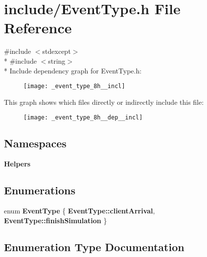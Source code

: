 \section{include/\+Event\+Type.h File Reference}
\label{_event_type_8h}
{\ttfamily \#include $<$stdexcept$>$}\\*
{\ttfamily \#include $<$string$>$}\\*
Include dependency graph for Event\+Type.\+h\+:
\nopagebreak
\begin{figure}[H]
\begin{center}
\leavevmode
\texttt{[image: \_event\_type\_8h\_\_incl]}
\end{center}
\end{figure}
This graph shows which files directly or indirectly include this file\+:
\nopagebreak
\begin{figure}[H]
\begin{center}
\leavevmode
\texttt{[image: \_event\_type\_8h\_\_dep\_\_incl]}
\end{center}
\end{figure}
\subsection*{Namespaces}
\begin{DoxyCompactItemize}
\item 
 {\bf Helpers}
\end{DoxyCompactItemize}
\subsection*{Enumerations}
\begin{DoxyCompactItemize}
\item 
enum {\bf Event\+Type} \{ {\bf Event\+Type\+::client\+Arrival}, 
{\bf Event\+Type\+::finish\+Simulation}
 \}
\end{DoxyCompactItemize}


\subsection{Enumeration Type Documentation}
